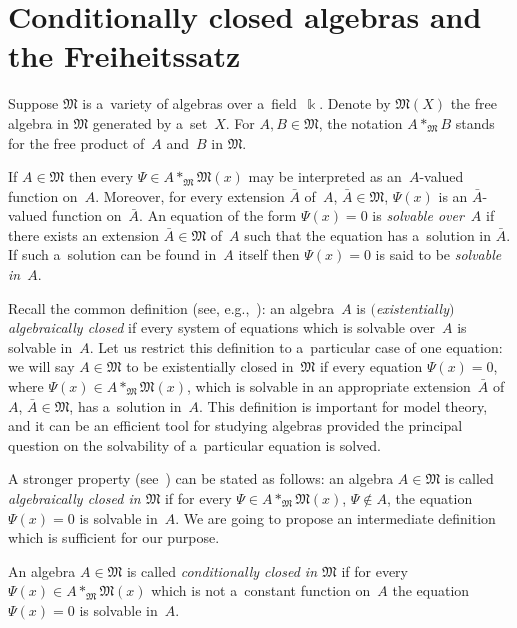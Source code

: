 \documentclass[11pt]{article}
\begin{document}
\section{Conditionally closed algebras and the Freiheitssatz}\label{sec1}

Suppose $\mathfrak M$ is a~variety of algebras over a~f\/ield~$\Bbbk $.
Denote by $\mathfrak M(X)$ the free algebra in $\mathfrak M$ generated by a~set~$X$.
For $A,B\in \mathfrak M$, the notation $A*_{\mathfrak M} B$ stands for the free product of~$A$ and~$B$ in $\mathfrak M$.

If $A\in \mathfrak M$ then every $\Psi \in A*_{\mathfrak M} \mathfrak M(x)$ may be interpreted as an~$A$-valued
function on~$A$.
Moreover, for every extension $\bar A$ of~$A$, $\bar A\in \mathfrak M$, $\Psi(x)$ is an $\bar A$-valued function
on~$\bar A$.
An equation of the form $\Psi(x)=0$ is {\em solvable over}~$A$ if there exists an extension $\bar A\in \mathfrak M$
of~$A$ such that the equation has a~solution in $\bar A$.
If such a~solution can be found in~$A$ itself then $\Psi(x)=0$ is said to be {\em solvable in}~$A$.

Recall the common def\/inition (see, e.g.,~\cite{Higman, Scott}): an algebra~$A$ is {\em $($existentially$)$ algebraically
closed\/} if every system of equations which is solvable over~$A$ is solvable in~$A$.
Let us restrict this def\/inition to a~particular case of one equation: we will say $A\in \mathfrak M$ to be existentially
closed in~$\mathfrak M$ if every equation $\Psi(x)=0$, where $\Psi(x)\in A*_{\mathfrak M} \mathfrak M(x)$, which is solvable in an
appropriate extension~$\bar A$ of~$A$, $\bar A\in \mathfrak M$, has a~solution in~$A$.
This def\/inition is important for model theory, and it can be an ef\/f\/icient tool for studying algebras provided the
principal question on the solvability of a~particular equation is solved.

A stronger property (see~\cite{Bokut66}) can be stated as follows: an algebra $A\in \mathfrak M$ is called {\em
algebraically closed in $\mathfrak M$} if for every $\Psi \in A*_{\mathfrak M} {\mathfrak M}(x)$, $\Psi\notin A$, the
equation $\Psi(x)=0$ is solvable in~$A$.
We are going to propose an intermediate def\/inition which is suf\/f\/icient for our purpose.

\begin{definition}
An algebra $A\in \mathfrak M$ is called {\em conditionally closed in $\mathfrak M$} if for every $\Psi(x)\in
A*_{\mathfrak M} {\mathfrak M}(x)$ which is not a~constant function on~$A$ the equation $\Psi(x)=0$ is solvable in~$A$.
\end{definition}
\end{document}
